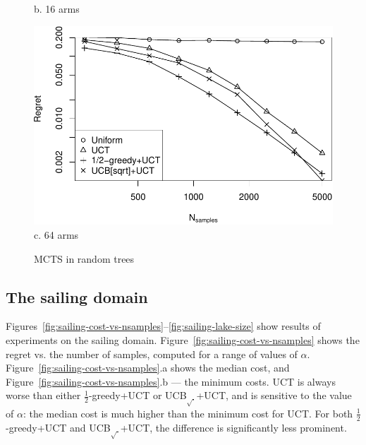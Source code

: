 \documentclass[letterpaper]{article}
\begin{document}
\begin{figure}[h!]
\begin{minipage}[c]{1.0\linewidth}
    b. 16 arms
    \vspace{0.5em}
  \end{minipage}
  \begin{minipage}[c]{1.0\linewidth}
    \centering
    \includegraphics[scale=0.45]{tree-identity-k=64-uqb=8.pdf} \\
    c. 64 arms
  \end{minipage}
  \caption{MCTS in random trees}
  \label{fig:mcts-regret}
\end{figure}

\subsection{The sailing domain}
\label{sec:emp-sailing}

Figures~\ref{fig:sailing-cost-vs-nsamples}--\ref{fig:sailing-lake-size}
show results of experiments on the sailing
domain. Figure~\ref{fig:sailing-cost-vs-nsamples} shows the regret
vs. the number of samples, computed for a range of values of
$\alpha$. Figure~\ref{fig:sailing-cost-vs-nsamples}.a shows the median
cost, and Figure~\ref{fig:sailing-cost-vs-nsamples}.b --- the minimum
costs. UCT is always worse than either $\frac 1 2$-greedy+UCT or
UCB$_{\sqrt{\cdot}}$+UCT, and is sensitive to the value of $\alpha$: the median cost is
much higher than the minimum cost for UCT. For both $\frac 1 2$-greedy+UCT
and UCB$_{\sqrt{\cdot}}$+UCT, the difference is significantly less prominent.
\end{document}
